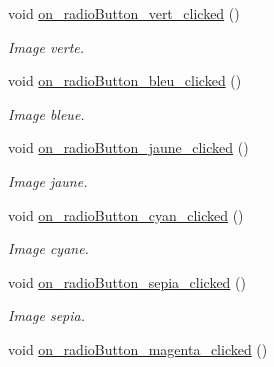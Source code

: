 \begin{DoxyCompactItemize}
\mbox{\label{classMainWindow_a7e733a84b4d9544190ce8f4a85a42b5f}} 
void \hyperlink{classMainWindow_a7e733a84b4d9544190ce8f4a85a42b5f}{on\+\_\+radio\+Button\+\_\+vert\+\_\+clicked} ()
\begin{DoxyCompactList}\small\item\em Image verte. \end{DoxyCompactList}\item 
\mbox{\label{classMainWindow_a6b57e90800526b9218644e5569b40471}} 
void \hyperlink{classMainWindow_a6b57e90800526b9218644e5569b40471}{on\+\_\+radio\+Button\+\_\+bleu\+\_\+clicked} ()
\begin{DoxyCompactList}\small\item\em Image bleue. \end{DoxyCompactList}\item 
\mbox{\label{classMainWindow_ae618d92ac47808e6f846fde6f7549277}} 
void \hyperlink{classMainWindow_ae618d92ac47808e6f846fde6f7549277}{on\+\_\+radio\+Button\+\_\+jaune\+\_\+clicked} ()
\begin{DoxyCompactList}\small\item\em Image jaune. \end{DoxyCompactList}\item 
\mbox{\label{classMainWindow_a4ce0e94016a53d79e6cdf6eaf8b7a417}} 
void \hyperlink{classMainWindow_a4ce0e94016a53d79e6cdf6eaf8b7a417}{on\+\_\+radio\+Button\+\_\+cyan\+\_\+clicked} ()
\begin{DoxyCompactList}\small\item\em Image cyane. \end{DoxyCompactList}\item 
\mbox{\label{classMainWindow_a330ba7333408e84f5259c55bab38a033}} 
void \hyperlink{classMainWindow_a330ba7333408e84f5259c55bab38a033}{on\+\_\+radio\+Button\+\_\+sepia\+\_\+clicked} ()
\begin{DoxyCompactList}\small\item\em Image sepia. \end{DoxyCompactList}\item 
\mbox{\label{classMainWindow_ad90a23f641924d6cf4c5f399bdb22c2e}} 
void \hyperlink{classMainWindow_ad90a23f641924d6cf4c5f399bdb22c2e}{on\+\_\+radio\+Button\+\_\+magenta\+\_\+clicked} ()

\end{DoxyCompactItemize}
